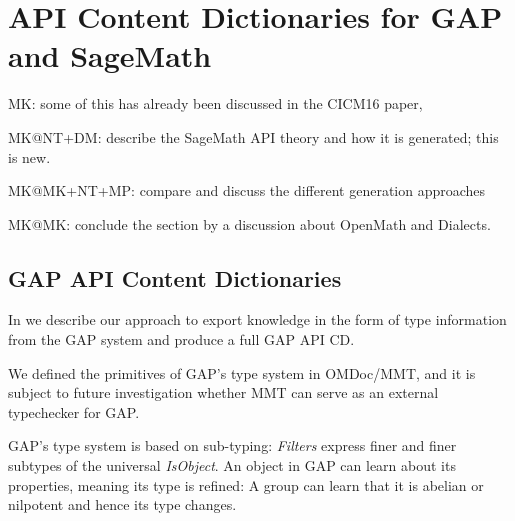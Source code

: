 \section{API Content Dictionaries for GAP and SageMath}\label{sec:apit}
\begin{todolist}{MK: some of this has already been discussed in the CICM16 paper, }
\item MK@NT+DM: describe the SageMath API theory and how it is generated; this is
  new. 
\item MK@MK+NT+MP: compare and discuss the different generation approaches
\item MK@MK: conclude the section by a discussion about OpenMath and Dialects.
\end{todolist}


\subsection{GAP API Content Dictionaries}

In \cite{DehKohKon:iop16} we describe our approach to export knowledge in the
form of type information from the GAP system and produce a full GAP API CD.

We defined the primitives of GAP's type system in OMDoc/MMT, and it is
subject to future investigation whether MMT can serve as an external typechecker
for GAP.

GAP's type system is based on sub-typing: \emph{Filters} express finer and finer
subtypes of the universal \emph{IsObject}. An object in GAP can learn about its
properties, meaning its type is refined: A group can learn that it is abelian or
nilpotent and hence its type changes.

